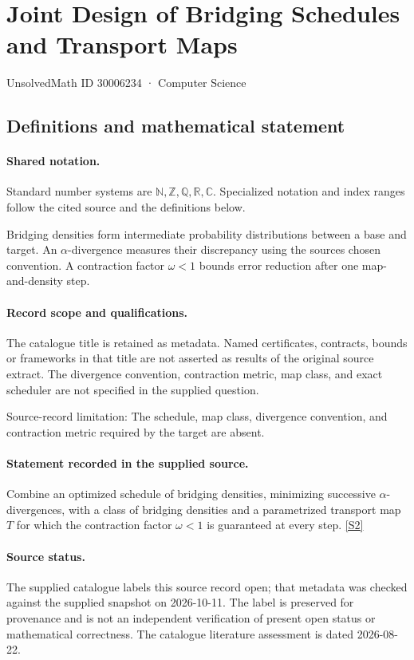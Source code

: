 \documentclass[11pt]{article}
\newcommand{\sref}[2]{\hyperlink{source:#1:#2}{[S#2]}}
\begin{document}
\setcounter{section}{30006233}
\section{Joint Design of Bridging Schedules and Transport Maps}\label{30006234}
{\small\sffamily UnsolvedMath ID 30006234 · Computer Science}
\subsection{Definitions and mathematical statement}

\paragraph{Shared notation.}Standard number systems are $\mathbb N,\mathbb Z,\mathbb Q,\mathbb R,\mathbb C$. Specialized notation and index ranges follow the cited source and the definitions below.


Bridging densities form intermediate probability distributions between a base and target. An $\alpha$-divergence measures their discrepancy using the source\textquotesingle s chosen convention. A contraction factor $\omega<1$ bounds error reduction after one map-and-density step.
\paragraph{Record scope and qualifications.}
The catalogue title is retained as metadata. Named certificates, contracts, bounds or frameworks in that title are not asserted as results of the original source extract.
The divergence convention, contraction metric, map class, and exact scheduler are not specified in the supplied question.

Source-record limitation: The schedule, map class, divergence convention, and contraction metric required by the target are absent.
\paragraph{Statement recorded in the supplied source.}
Combine an optimized schedule of bridging densities, minimizing successive $\alpha$-divergences, with a class of bridging densities and a parametrized transport map $T$ for which the contraction factor $\omega<1$ is guaranteed at every step. \sref{30006234}{2}
\paragraph{Source status.}
The supplied catalogue labels this source record open; that metadata was checked against the supplied snapshot on 2026-10-11. The label is preserved for provenance and is not an independent verification of present open status or mathematical correctness. The catalogue literature assessment is dated 2026-08-22.
\end{document}

